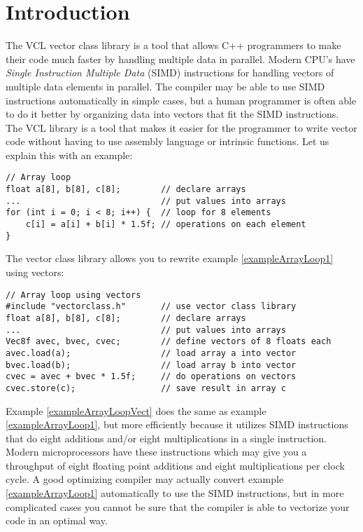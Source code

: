 \documentclass[vcl_manual.tex]{subfiles}
\begin{document}
\chapter{Introduction}\label{chap:Introduction}
\flushleft
The VCL vector class library is a tool that allows C++ programmers to make their code much faster by handling multiple data in parallel. Modern CPU’s have \textit{Single Instruction Multiple Data} (SIMD) instructions for handling vectors of multiple data elements in parallel. The compiler may be able to use SIMD instructions automatically in simple cases, but a human programmer is often able to do it better by organizing data into vectors that fit the SIMD instructions. The VCL library is a tool that makes it easier for the programmer to write vector code without having to use assembly language or intrinsic functions. Let us explain this with an example:

\begin{example}
\label{exampleArrayLoop1}
\end{example} %
\begin{lstlisting}[frame=single]
// Array loop
float a[8], b[8], c[8];        // declare arrays
...                            // put values into arrays
for (int i = 0; i < 8; i++) {  // loop for 8 elements
    c[i] = a[i] + b[i] * 1.5f; // operations on each element
}
\end{lstlisting}

The vector class library allows you to rewrite example \ref{exampleArrayLoop1} using vectors:

\begin{example}
\label{exampleArrayLoopVect}
\end{example}
\begin{lstlisting}[frame=single]
// Array loop using vectors
#include "vectorclass.h"       // use vector class library
float a[8], b[8], c[8];        // declare arrays
...                            // put values into arrays
Vec8f avec, bvec, cvec;        // define vectors of 8 floats each
avec.load(a);                  // load array a into vector
bvec.load(b);                  // load array b into vector
cvec = avec + bvec * 1.5f;     // do operations on vectors
cvec.store(c);                 // save result in array c
\end{lstlisting}

Example \ref{exampleArrayLoopVect} does the same as example \ref{exampleArrayLoop1}, but more efficiently because it utilizes SIMD instructions that do eight additions and/or eight multiplications in a single instruction. Modern microprocessors have these instructions which may give you a throughput of eight floating point additions and eight multiplications per clock cycle. A good optimizing compiler may actually convert example \ref{exampleArrayLoop1} automatically to use the SIMD instructions, but in more complicated cases you cannot be sure that the compiler is able to vectorize your code in an optimal way.
\end{document}
